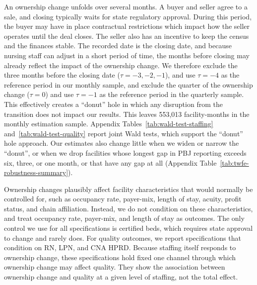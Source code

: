 \documentclass[12pt]{article}
\begin{document}
An ownership change unfolds over several months. A buyer and seller agree to a sale, and closing typically waits for state regulatory approval. During this period, the buyer may have in place contractual restrictions which impact how the seller operates until the deal closes. The seller also has an incentive to keep the census and the finances stable. The recorded date is the closing date, and because nursing staff can adjust in a short period of time, the months before closing may already reflect the impact of the ownership change. We therefore exclude the three months before the closing date (\(\tau=-3,-2,-1\)), and use \(\tau=-4\) as the reference period in our monthly sample, and exclude the quarter of the ownership change (\(\tau=0\)) and use \(\tau=-1\) as the reference period in the quarterly sample. This effectively creates a ``donut'' hole in which any disruption from the transition does not impact our results. This leaves 553,013 facility-months in the monthly estimation sample. Appendix Tables~\ref{tab:wald-test-staffing} and~\ref{tab:wald-test-quality} report joint Wald tests, which support the ``donut'' hole approach. Our estimates also change little when we widen or narrow the ``donut'', or when we drop facilities whose longest gap in PBJ reporting exceeds six, three, or one month, or that have any gap at all (Appendix Table~\ref{tab:twfe-robustness-summary}).  

Ownership changes plausibly affect facility characteristics that would normally be controlled for, such as occupancy rate, payer-mix, length of stay, acuity, profit status, and chain affiliation. Instead, we do not condition on these characteristics, and treat occupancy rate, payer-mix, and length of stay as outcomes. The only control we use for all specifications is certified beds, which requires state approval to change and rarely does. For quality outcomes, we report specifications that condition on RN, LPN, and CNA HPRD. Because staffing itself responds to ownership change, these specifications hold fixed one channel through which ownership change may affect quality. They show the association between ownership change and quality at a given level of staffing, not the total effect.
\end{document}

